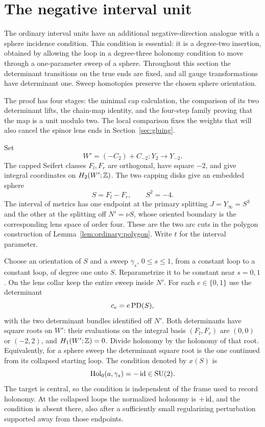 \section{The negative interval unit}\label{sec:negative}

The ordinary interval units have an additional negative-direction analogue
with a sphere incidence condition.  This condition is essential: it is a
degree-two insertion, obtained by allowing the loop in a degree-three
holonomy condition to move through a one-parameter sweep of a sphere.
Throughout this section the determinant transitions on the true ends are
fixed, and all gauge transformations have determinant one.  Sweep
homotopies preserve the chosen sphere orientation.

The proof has four stages: the minimal cap calculation, the comparison
of its two determinant lifts, the chain-map identity, and the
four-step family proving that the map is a unit modulo two.  The local
comparison fixes the weights that will also cancel the spinor lens ends
in Section~\ref{sec:gluing}.

Set
\[
 W'=(-C_2)+C_{-2}\colon Y_2\longrightarrow Y_{-2}.
\]
The capped Seifert classes $F_l,F_r$ are orthogonal, have square $-2$, and
give integral coordinates on $H_2(W';\mathbb Z)$.  The two capping disks give an
embedded sphere
\begin{equation}\label{eq:negative:sphere}
 S=F_l-F_r,\qquad S^2=-4.
\end{equation}
The interval of metrics has one endpoint at the primary splitting
$J=Y_\infty=S^3$ and the other at the splitting off
$N'=\nu S$, whose oriented boundary is the corresponding lens space of
order four.  These are the two arc cuts in the polygon construction of
Lemma~\ref{lem:ordinary:polygon}.  Write $t$ for the interval parameter.

Choose an orientation of $S$ and a sweep $\gamma_s$, $0\le s\le1$, from a
constant loop to a constant loop, of degree one onto $S$.  Reparametrize
it to be constant near $s=0,1$.  On the lens collar keep the entire sweep
inside $N'$.  For each $e\in\{0,1\}$ use the determinant
\begin{equation}\label{eq:negative:lifts}
 c_e=e\operatorname{PD}(S),
\end{equation}
with the two determinant bundles identified off $N'$.  Both determinants
have square roots on $W'$: their evaluations on the integral basis
$(F_l,F_r)$ are $(0,0)$ or $(-2,2)$, and $H_1(W';\mathbb Z)=0$.
Divide holonomy by the holonomy of that root.  Equivalently, for a sphere
sweep the determinant square root is the one continued from its
collapsed starting loop.  The condition denoted by $x(S)$ is
\begin{equation}\label{eq:negative:cut}
 \operatorname{Hol}_0(a,\gamma_s)=-\operatorname{id}\in\operatorname{SU}(2).
\end{equation}
The target is central, so the condition is independent of the frame
used to record holonomy.  At the collapsed loops the normalized holonomy
is $+\operatorname{id}$, and the condition is absent there, also after a sufficiently
small regularizing perturbation supported away from those endpoints.

